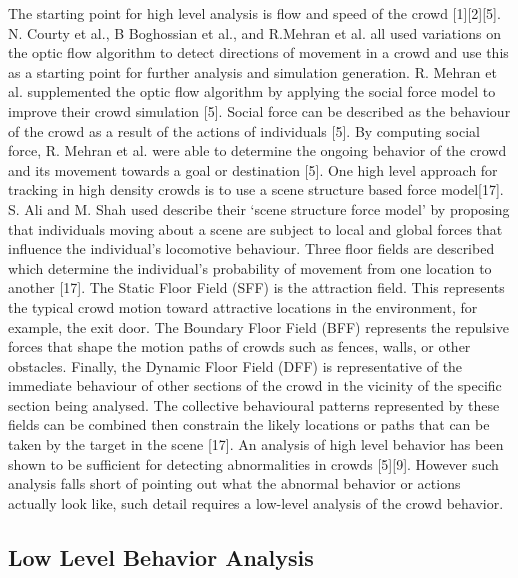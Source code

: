 \documentclass[conference]{IEEEtran}
\begin{document}
The starting point for high level analysis is flow and speed of the crowd [1][2][5]. N. Courty et al., B Boghossian et al., and R.Mehran et al. all used variations on the optic flow algorithm to detect directions of movement in a crowd and use this as a starting point for further analysis and simulation generation. R. Mehran et al. supplemented the optic flow algorithm by applying the social force model to improve their crowd simulation [5]. Social force can be described as the behaviour of the crowd as a result of the actions of individuals [5]. By computing social force, R. Mehran et al. were able to determine the ongoing behavior of the crowd and its movement towards a goal or destination [5]. 
One high level approach for tracking in high density crowds is to use a scene structure based force model[17]. S. Ali and M. Shah used describe their ‘scene structure force model’ by proposing that individuals moving about a scene are subject to local and global forces that influence the individual’s locomotive behaviour. Three floor fields are described which determine the individual’s probability of movement from one location to another [17]. The Static Floor Field (SFF) is the attraction field. This represents the typical crowd motion toward attractive locations in the environment, for example, the exit door. The Boundary Floor Field (BFF) represents the repulsive forces that shape the motion paths of crowds such as fences, walls, or other obstacles. Finally, the Dynamic Floor Field (DFF) is representative of the immediate behaviour of other sections of the crowd in the vicinity of the specific section being analysed. The collective behavioural patterns represented by these fields can be combined then constrain the likely locations or paths that can be taken by the target in the scene [17]. 
An analysis of high level behavior has been shown to be sufficient for detecting abnormalities in crowds [5][9]. However such analysis falls short of pointing out what the abnormal behavior or actions actually look like, such detail requires a low-level analysis of the crowd behavior.

\subsection{Low Level Behavior Analysis}
\end{document}
